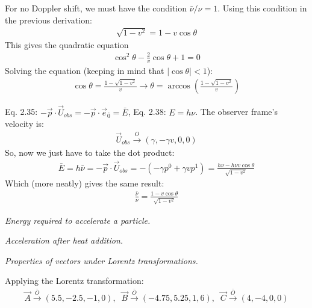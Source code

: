 \documentclass{report}
\begin{document}
\begin{subquests}
\begin{subquests}
		\item
		For no Doppler shift, we must have the condition ${\bar \nu}/{\nu} = 1$. Using this condition in the previous derivation:
		\begin{gather*}
			\sqrt{1-v^2} = 1 - v\cos\theta
		\end{gather*}
		This gives the quadratic equation
		\begin{gather*}
			\cos^2\theta -\frac{2}{v}\cos\theta + 1 = 0
		\end{gather*}
		Solving the equation (keeping in mind that $|\cos\theta| < 1 $):
		\begin{gather*}
			\cos\theta = \frac{1 - \sqrt{1-v^2}}{v} \longrightarrow \theta = \arccos \left(\frac{1 - \sqrt{1-v^2}}{v} \right)
		\end{gather*}
		
		\item
		Eq. 2.35: $-\vec p \cdot \vec U_{obs} = -\vec p \cdot \vec e_{\bar 0} = \bar E$, Eq. 2.38: $E = h\nu$. The observer frame's velocity is:
		\begin{gather*}
			\vec U_{obs} \stackrel{O}\longrightarrow (\gamma, -\gamma v, 0, 0)
		\end{gather*}
		So, now we just have to take the dot product:
		\begin{gather*}
			\bar E = h{\bar \nu} = -\vec p \cdot \vec U_{obs} = -\left(-\gamma p^0 + \gamma vp^1\right) = \frac{h\nu - h\nu v \cos\theta}{\sqrt{1-v^2}}
		\end{gather*}
		Which (more neatly) gives the same result:
		\begin{gather*}
			\frac{\bar \nu}{\nu} = \frac{1 - v\cos\theta}{\sqrt{1-v^2}}
		\end{gather*}
	\end{subquests}

	\item \emph{Energy required to accelerate a particle.}

	\item \emph{Acceleration after heat addition.}

	\item \emph{Properties of vectors under Lorentz transformations.}
	\begin{subquests}
		\item
		Applying the Lorentz transformation:
		\begin{gather*}
			\vec A \stackrel{\bar O}\longrightarrow (5.5, -2.5, -1, 0), \;\; 
			\vec B \stackrel{\bar O}\longrightarrow (-4.75, 5.25, 1, 6), \;\; 
			\vec C \stackrel{\bar O}\longrightarrow (4, -4, 0, 0)
		\end{gather*}
		

\end{subquests}
\end{subquests}
\end{document}
